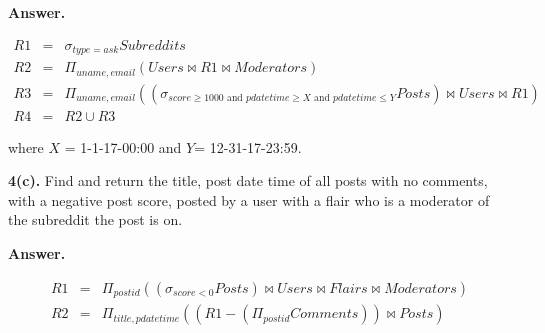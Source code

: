 \documentclass[11pt]{article}
\begin{document}
{\bf Answer.} 

\begin{eqnarray*}
  R1 & = & \sigma_{type=ask} Subreddits \\
  R2 & = & \Pi_{uname,email}(Users \bowtie R1 \bowtie Moderators)\\
  R3 & = & \Pi_{uname,email} ((\sigma_{score\geq 1000 \mbox{ and } pdatetime \geq X \mbox { and } pdatetime \leq Y} Posts) \bowtie Users \bowtie R1)\\
  R4 & = & R2 \cup R3
\end{eqnarray*}

where $X$ = 1-1-17-00:00 and $Y$= 12-31-17-23:59.

{\bf 4(c).} Find and return the title, post date time of all posts with
no comments, with a negative post score, posted by a user with a flair
who is a moderator of the subreddit the post is on.

{\bf Answer.} 

\begin{eqnarray*}
  R1 & = & \Pi_{postid} ((\sigma_{score<0} Posts)\bowtie Users \bowtie Flairs \bowtie Moderators) \\
  R2 & = & \Pi_{title, pdatetime} (( R1- (\Pi_{postid} Comments))\bowtie Posts)
\end{eqnarray*}
\end{document}
